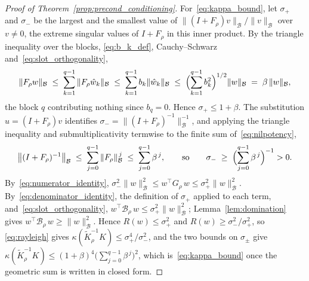 \documentclass[hidelinks]{siamart}
\theoremstyle{nonumberplain}
\numberwithin{theorem}{section}
\begin{document}
\begin{proof}[Proof of Theorem~\textup{\ref{prop:precond_conditioning}}]
For~\eqref{eq:kappa_bound}, let $\sigma_+$ and $\sigma_-$ be the largest
and the smallest value of
$\|(I + F_\rho) v\|_{\mathcal{B}} / \|v\|_{\mathcal{B}}$ over $v \neq 0$, the
extreme singular values of $I + F_\rho$ in this inner product.  By the
triangle inequality over the blocks,
\eqref{eq:b_k_def}, Cauchy--Schwarz and~\eqref{eq:slot_orthogonality},
\[
  \|F_\rho w\|_{\mathcal{B}} \;\leq\; \sum_{k=1}^{q-1} \|F_\rho \hat{w}_k\|_{\mathcal{B}}
  \;\leq\; \sum_{k=1}^{q-1} b_k \|\hat{w}_k\|_{\mathcal{B}}
  \;\leq\; \Bigl(\sum_{k=1}^{q-1} b_k^2\Bigr)^{1/2} \|w\|_{\mathcal{B}}
  \;=\; \beta\, \|w\|_{\mathcal{B}} ,
\]
the block $q$ contributing nothing since $b_q = 0$.  Hence
$\sigma_+ \leq 1 + \beta$.  The substitution $u = (I+F_\rho)v$
identifies $\sigma_- = \|(I+F_\rho)^{-1}\|_{\mathcal{B}}^{-1}$, and applying the
triangle inequality and submultiplicativity termwise to the finite sum
of~\eqref{eq:nilpotency},
\[
  \bigl\|(I+F_\rho)^{-1}\bigr\|_{\mathcal{B}}
  \;\leq\; \sum_{j=0}^{q-1} \|F_\rho\|_{\mathcal{B}}^{\,j}
  \;\leq\; \sum_{j=0}^{q-1} \beta^{\,j},
  \qquad \text{so} \qquad
  \sigma_- \;\geq\; \Bigl(\sum_{j=0}^{q-1} \beta^{\,j}\Bigr)^{-1} > 0 .
\]
By~\eqref{eq:numerator_identity},
$\sigma_-^2 \|w\|_{\mathcal{B}}^2 \leq w^\top G_\rho\, w \leq \sigma_+^2 \|w\|_{\mathcal{B}}^2$.
By~\eqref{eq:denominator_identity}, the definition of $\sigma_+$ applied
to each term, and~\eqref{eq:slot_orthogonality},
$w^\top \mathcal{B}_\rho\, w \leq \sigma_+^2 \|w\|_{\mathcal{B}}^2$;
Lemma~\ref{lem:domination} gives $w^\top \mathcal{B}_\rho\, w \geq \|w\|_{\mathcal{B}}^2$.
Hence $R(w) \leq \sigma_+^2$ and $R(w) \geq \sigma_-^2/\sigma_+^2$, so
\eqref{eq:rayleigh} gives
$\kappa(\widetilde{K}_\rho^{-1} K) \leq \sigma_+^4 / \sigma_-^2$, and the two bounds on
$\sigma_\pm$ give
$\kappa(\widetilde{K}_\rho^{-1} K) \leq (1+\beta)^4
 \bigl(\sum_{j=0}^{q-1}\beta^{\,j}\bigr)^2$, which
is~\eqref{eq:kappa_bound} once the geometric sum is written in closed
form.


\end{proof}
\end{document}
